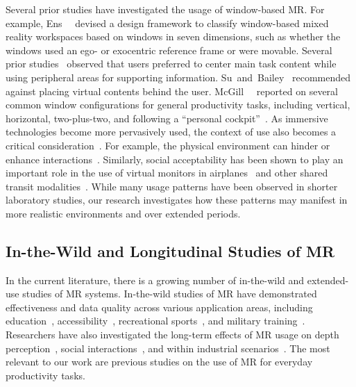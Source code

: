 Several prior studies have investigated the usage of window-based MR. 
For example, Ens~\etal~\cite{ens2014ethereal} devised a design framework to classify window-based mixed reality workspaces based on windows in seven dimensions, such as whether the windows used an ego- or exocentric reference frame or were movable.
Several prior studies~\cite{cheng2021semanticadapt,pavanatto2024xrwild,lischke2016screenarrangement} observed that users preferred to center main task content while using peripheral areas for supporting information.
Su~and~Bailey~\cite{su2005positioning} recommended against placing virtual contents behind the user.
McGill~\etal~\cite{mcgill2020seatedvrworkspace} reported on several common window configurations for general productivity tasks, including vertical, horizontal, two-plus-two, and following a ``personal cockpit''~\cite{ens2014personalcockpit}.
As immersive technologies become more pervasively used, 
the context of use also becomes a critical consideration~\cite{grubert2017pervasive}.
For example, the physical environment can hinder or enhance interactions~\cite{cheng2023interactionadapt}.
Similarly, social acceptability has been shown to play an important role in the use of virtual monitors in airplanes~\cite{ng2021passengerexperiencemrairplane} and other shared transit modalities~\cite{medeiros2022shieldingar}.
While many usage patterns have been observed in shorter laboratory studies, our research investigates how these patterns may manifest in more realistic environments and over extended periods.

\subsection{In-the-Wild and Longitudinal Studies of MR}
In the current literature, there is a growing number of in-the-wild and extended-use studies of MR systems.
In-the-wild studies of MR have demonstrated effectiveness and data quality across various application areas, including education~\cite{petersen2021pedagogical},
accessibility~\cite{schmelter2023accessible},
recreational sports~\cite{colley2015blended,colley2017ubimount}, and military training~\cite{laviola2015military}.
Researchers have also investigated the long-term effects of MR usage on depth perception~\cite{kohm2022objects}, social interactions~\cite{han2023longitudinal,bailenson2006longitudinal}, and within industrial scenarios~\cite{grubert2010mobileindustrialar}.
The most relevant to our work are previous studies on the use of MR for everyday productivity tasks. 

